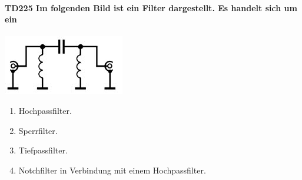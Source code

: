 \documentclass[8pt]{article}
\begin{document}
\begin{enumerate}
\begin{enumerate}[nolistsep,label=\Alph*]
{\paragraph*{TD225 Im folgenden Bild ist ein Filter dargestellt. Es handelt sich um ein}
\begin{center}
	\begin{minipage}{\linewidth}
		\centering
		\includegraphics[scale=1.0]{pics/td225_a.jpg}
	\end{minipage}
\end{center}
\begin{enumerate}[nolistsep,label=\Alph*]
\item Hochpassfilter.
\item Sperrfilter.
\item Tiefpassfilter.
\item Notchfilter in Verbindung mit einem Hochpassfilter.
\end{enumerate}

}
\end{enumerate}
\end{enumerate}
\end{document}
